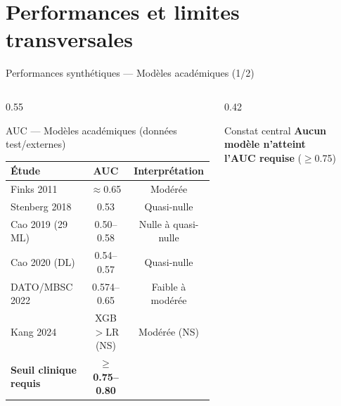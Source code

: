 \documentclass[aspectratio=169]{beamer}
\begin{document}
\section{Performances et limites transversales}

\begin{frame}{Performances synthétiques --- Modèles académiques (1/2)}
  \begin{columns}[T]
    \begin{column}{0.55\textwidth}
      \begin{block}{AUC --- Modèles académiques (données test/externes)}
        \footnotesize
        \begin{tabular}{lcc}
          \toprule
          \textbf{Étude} & \textbf{AUC} & \textbf{Interprétation} \\
          \midrule
          Finks 2011
            & $\approx$0.65
            & \textcolor{orangemod}{Modérée} \\[3pt]
          Stenberg 2018
            & 0.53
            & \textcolor{rougealerte}{Quasi-nulle} \\[3pt]
          Cao 2019 (29 ML)
            & 0.50--0.58
            & \textcolor{rougealerte}{Nulle à quasi-nulle} \\[3pt]
          Cao 2020 (DL)
            & 0.54--0.57
            & \textcolor{rougealerte}{Quasi-nulle} \\[3pt]
          DATO/MBSC 2022
            & 0.574--0.65
            & \textcolor{orangemod}{Faible à modérée} \\[3pt]
          Kang 2024
            & XGB$>$LR (NS)
            & \textcolor{orangemod}{Modérée (NS)} \\
          \midrule
          \textbf{Seuil clinique requis}
            & \textbf{$\geq$0.75--0.80}
            & \\
          \bottomrule
        \end{tabular}
      \end{block}
    \end{column}
    \begin{column}{0.42\textwidth}
      \begin{alertblock}{Constat central}
        \footnotesize
        \textbf{Aucun modèle n'atteint}\\
        \textbf{l'AUC requise} ($\geq$0.75)\\

\end{alertblock}
\end{column}
\end{columns}
\end{frame}
\end{document}
